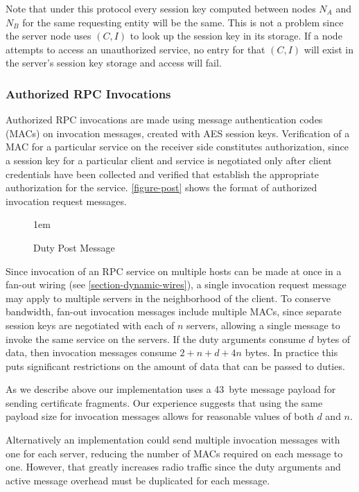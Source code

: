 Note that under this protocol every session key computed between nodes $N_A$ and $N_B$ for the
same requesting entity will be the same. This is not a problem since the server node uses $(C,
I)$ to look up the session key in its storage. If a node attempts to access an unauthorized
service, no entry for that $(C, I)$ will exist in the server's session key storage and access
will fail.

\subsubsection{Authorized RPC Invocations}

Authorized RPC invocations are made using message authentication codes (MACs) on invocation
messages, created with AES session keys. Verification of a MAC for a particular service on the
receiver side constitutes authorization, since a session key for a particular client and service
is negotiated only after client credentials have been collected and verified that establish the
appropriate authorization for the service. \autoref{figure-post} shows the format of authorized
invocation request messages.

\begin{figure}[t]
  
  \centerline{\raise 1em\box\graph}
  \caption{Duty Post Message}
  \label{figure-post}
\end{figure}

Since invocation of an RPC service on multiple hosts can be made at once in a fan-out wiring
(see \autoref{section-dynamic-wires}), a single invocation request message may apply to multiple
servers in the neighborhood of the client. To conserve bandwidth, fan-out invocation messages
include multiple MACs, since separate session keys are negotiated with each of $n$ servers,
allowing a single message to invoke the same service on the servers. If the duty arguments
consume $d$ bytes of data, then invocation messages consume $2 + n + d + 4n$ bytes. In practice
this puts significant restrictions on the amount of data that can be passed to duties.

As we describe above our implementation uses a 43~byte message payload for sending certificate
fragments. Our experience suggests that using the same payload size for invocation messages
allows for reasonable values of both $d$ and $n$.

Alternatively an implementation could send multiple invocation messages with one for each
server, reducing the number of MACs required on each message to one. However, that greatly
increases radio traffic since the duty arguments and active message overhead must be duplicated
for each message.

